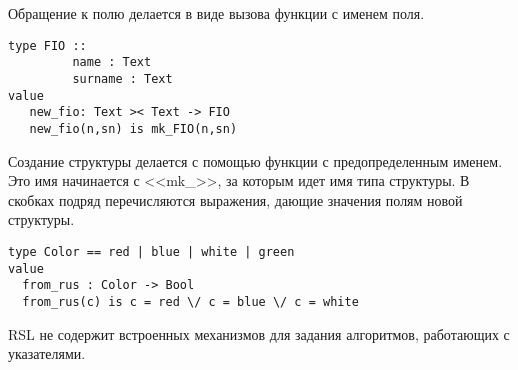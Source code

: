 Обращение к полю делается в виде вызова функции с именем поля.

\begin{lstlisting}
type FIO ::
         name : Text
         surname : Text
value
   new_fio: Text >< Text -> FIO
   new_fio(n,sn) is mk_FIO(n,sn)
\end{lstlisting}

Создание структуры делается с помощью функции с предопределенным именем. Это имя начинается с <<mk\_>>, за которым идет имя типа структуры. В скобках подряд перечисляются выражения, дающие значения полям новой структуры.

\begin{lstlisting}
type Color == red | blue | white | green
value
  from_rus : Color -> Bool
  from_rus(c) is c = red \/ c = blue \/ c = white
\end{lstlisting}

RSL не содержит встроенных механизмов для задания алгоритмов, работающих с указателями.
